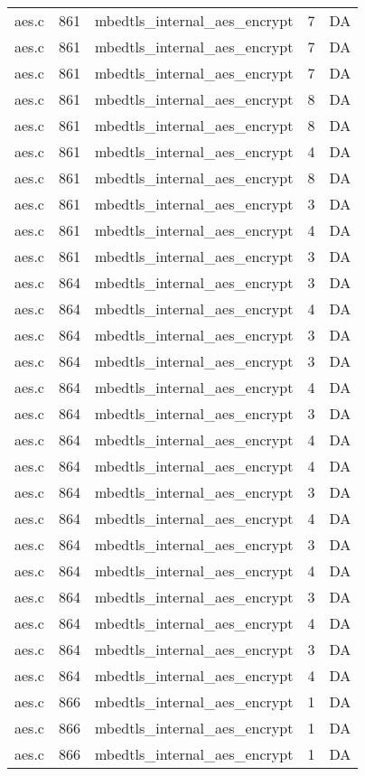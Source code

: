 \begin{table}[h]
{\begin{tabular}{clrrr}
aes.c&861&mbedtls\_internal\_aes\_encrypt&7 &DA\\
aes.c&861&mbedtls\_internal\_aes\_encrypt&7 &DA\\
aes.c&861&mbedtls\_internal\_aes\_encrypt&7 &DA\\
aes.c&861&mbedtls\_internal\_aes\_encrypt&8 &DA\\
aes.c&861&mbedtls\_internal\_aes\_encrypt&8 &DA\\
aes.c&861&mbedtls\_internal\_aes\_encrypt&4 &DA\\
aes.c&861&mbedtls\_internal\_aes\_encrypt&8 &DA\\
aes.c&861&mbedtls\_internal\_aes\_encrypt&3 &DA\\
aes.c&861&mbedtls\_internal\_aes\_encrypt&4 &DA\\
aes.c&861&mbedtls\_internal\_aes\_encrypt&3 &DA\\
aes.c&864&mbedtls\_internal\_aes\_encrypt&3 &DA\\
aes.c&864&mbedtls\_internal\_aes\_encrypt&4 &DA\\
aes.c&864&mbedtls\_internal\_aes\_encrypt&3 &DA\\
aes.c&864&mbedtls\_internal\_aes\_encrypt&3 &DA\\
aes.c&864&mbedtls\_internal\_aes\_encrypt&4 &DA\\
aes.c&864&mbedtls\_internal\_aes\_encrypt&3 &DA\\
aes.c&864&mbedtls\_internal\_aes\_encrypt&4 &DA\\
aes.c&864&mbedtls\_internal\_aes\_encrypt&4 &DA\\
aes.c&864&mbedtls\_internal\_aes\_encrypt&3 &DA\\
aes.c&864&mbedtls\_internal\_aes\_encrypt&4 &DA\\
aes.c&864&mbedtls\_internal\_aes\_encrypt&3 &DA\\
aes.c&864&mbedtls\_internal\_aes\_encrypt&4 &DA\\
aes.c&864&mbedtls\_internal\_aes\_encrypt&3 &DA\\
aes.c&864&mbedtls\_internal\_aes\_encrypt&4 &DA\\
aes.c&864&mbedtls\_internal\_aes\_encrypt&3 &DA\\
aes.c&864&mbedtls\_internal\_aes\_encrypt&4 &DA\\
aes.c&866&mbedtls\_internal\_aes\_encrypt&1 &DA\\
aes.c&866&mbedtls\_internal\_aes\_encrypt&1 &DA\\
aes.c&866&mbedtls\_internal\_aes\_encrypt&1 &DA\\

\end{tabular}}
\end{table}
